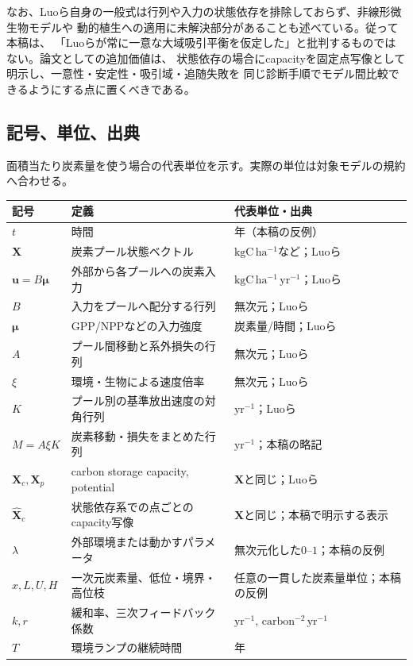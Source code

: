 \documentclass[a4paper,11pt]{ltjsarticle}
\begin{document}
なお、Luoら自身の一般式は行列や入力の状態依存を排除しておらず、非線形微生物モデルや
動的植生への適用に未解決部分があることも述べている\cite{luo2022}。従って本稿は、
「Luoらが常に一意な大域吸引平衡を仮定した」と批判するものではない。論文としての追加価値は、
状態依存の場合にcapacityを固定点写像として明示し、一意性・安定性・吸引域・追随失敗を
同じ診断手順でモデル間比較できるようにする点に置くべきである。

\subsection{記号、単位、出典}
面積当たり炭素量を使う場合の代表単位を示す。実際の単位は対象モデルの規約へ合わせる。
\begin{longtable}{p{.17\linewidth}p{.43\linewidth}p{.29\linewidth}}
\toprule 記号 & 定義 & 代表単位・出典\\\midrule\endhead
$t$ & 時間 & 年（本稿の反例）\\
$\bm X$ & 炭素プール状態ベクトル & $\mathrm{kgC\,ha^{-1}}$など；Luoら\cite{luo2022}\\
$\bm u=B\bm\mu$ & 外部から各プールへの炭素入力 & $\mathrm{kgC\,ha^{-1}\,yr^{-1}}$；Luoら\\
$B$ & 入力をプールへ配分する行列 & 無次元；Luoら\\
$\bm\mu$ & GPP/NPPなどの入力強度 & 炭素量/時間；Luoら\\
$A$ & プール間移動と系外損失の行列 & 無次元；Luoら\\
$\xi$ & 環境・生物による速度倍率 & 無次元；Luoら\\
$K$ & プール別の基準放出速度の対角行列 & $\mathrm{yr^{-1}}$；Luoら\\
$M=A\xi K$ & 炭素移動・損失をまとめた行列 & $\mathrm{yr^{-1}}$；本稿の略記\\
$\bm X_c,\bm X_p$ & carbon storage capacity, potential & $\bm X$と同じ；Luoら\\
$\widehat{\bm X}_c$ & 状態依存系での点ごとのcapacity写像 & $\bm X$と同じ；本稿で明示する表示\\
$\lambda$ & 外部環境または動かすパラメータ & 無次元化した$0$--$1$；本稿の反例\\
$x,L,U,H$ & 一次元炭素量、低位・境界・高位枝 & 任意の一貫した炭素量単位；本稿の反例\\
$k,r$ & 緩和率、三次フィードバック係数 & $\mathrm{yr^{-1}}$, $\mathrm{carbon^{-2}\,yr^{-1}}$\\
$T$ & 環境ランプの継続時間 & 年\\
\bottomrule
\end{longtable}
\end{document}
